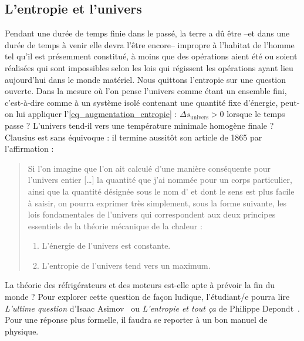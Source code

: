 	\subsection{L’entropie et l’univers}
	
			Pendant une durée de temps finie dans le passé, la terre a dû être --et dans une durée de temps à venir elle devra l’être encore-- impropre à l’habitat de l’homme tel qu’il est présemment constitué, à moins que des opérations aient été ou soient réalisées qui sont impossibles selon les lois qui régissent les opérations ayant lieu aujourd’hui dans le monde matériel.
		Nous quittons l’entropie sur une question ouverte. Dans la mesure où l’on pense l’univers comme étant un ensemble fini, c’est-à-dire comme à un système isolé contenant une quantité fixe d’énergie, peut-on lui appliquer l’\cref{eq_augmentation_entropie} : $\Delta s_\text{univers} > 0$ lorsque le temps passe ? L’univers tend-il vers une température minimale homogène finale ? Clausius est sans équivoque : il termine aussitôt son article de 1865 par l’affirmation :
			
			\begin{quote}
				Si l’on imagine que l’on ait calculé d’une manière conséquente pour l’univers entier […] la quantité que j’ai nommée  pour un corps particulier, ainsi que la quantité désignée sous le nom d’ et dont le sens est plus facile à saisir, on pourra exprimer très simplement, sous la forme suivante, les lois fondamentales de l’univers qui correspondent aux deux principes essentiels de la théorie mécanique de la chaleur :
					\begin{enumerate}
						\item L’énergie de l’univers est constante.
						\item L’entropie de l’univers tend vers un maximum.
					\end{enumerate}
			\end{quote}
		
		La théorie des réfrigérateurs et des moteurs est-elle apte à prévoir la fin du monde ? Pour explorer cette question de façon ludique, l’étudiant/e pourra lire \textit{L’ultime question} d’Isaac \mbox{Asimov}~\cite{asimov1956,asimov1956fr} ou \textit{L’entropie et tout ça} de Philippe \mbox{Depondt}~\cite{depondt2001}. Pour une réponse plus formelle, il faudra se reporter à un bon manuel de physique.
